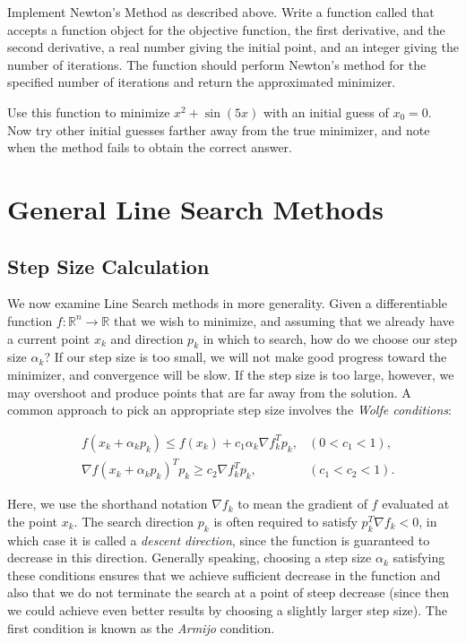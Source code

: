 \begin{problem}
Implement Newton's Method as described above. Write a function called  that
accepts a function object for the objective function, the first derivative, and the
second derivative, a real number giving the initial point, and an integer giving the number
of iterations. The function should perform Newton's method for the specified number of iterations
and return the approximated minimizer.

Use this function to minimize $x^2 + \sin(5x)$ with an initial guess of $x_0 = 0$.
Now try other initial guesses farther away from the true minimizer, and note when the
method fails to obtain the correct answer.
\end{problem}

\section*{General Line Search Methods}
\subsection*{Step Size Calculation}
We now examine Line Search methods in more generality. Given a differentiable function
$f : \mathbb{R}^n \rightarrow \mathbb{R}$ that we wish to minimize, and assuming that
we already have a current point $x_k$ and direction $p_k$ in which to search, how do we
choose our step size $\alpha_k$? If our step size is too small, we will not make good progress
toward the minimizer, and convergence will be slow. If the step size is too large, however,
we may overshoot and produce points that are far away from the solution.
A common approach to pick an appropriate step size involves the \emph{Wolfe conditions}:

\begin{align*}
&f(x_k + \alpha_kp_k) \leq f(x_k) + c_1\alpha_k\nabla f_k^Tp_k, &(0 < c_1 < 1),
\\ &\nabla f(x_k + \alpha_kp_k)^Tp_k \geq c_2\nabla f_k^Tp_k, &(c_1 < c_2 < 1).
\end{align*}

Here, we use the shorthand notation $\nabla f_k$ to
mean the gradient of $f$ evaluated at the point $x_k$. The search direction $p_k$ is
often required to satisfy $p_k^T \nabla f_k < 0$, in which case it is called a
\emph{descent direction}, since the function is guaranteed to decrease in
this direction. Generally speaking, choosing a step size $\alpha_k$ satisfying these conditions
ensures that we achieve sufficient decrease in the function and also that we do not
terminate the search at a point of steep decrease (since then we could achieve even
better results by choosing a slightly larger step size). The first condition is known
as the \emph{Armijo} condition.

